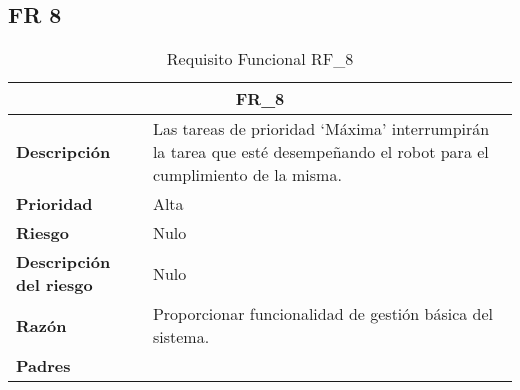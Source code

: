 \documentclass{scrreprt}
\begin{document}
\subsection{FR 8}
\begin{table}[H]
    
    \label{tab:my-table}
    
    \begin{tabular}{|p{5cm}|p{11cm}|}
    \hline
    \multicolumn{2}{|c|}{\textbf{FR_8}} \\
    \hline
    \textbf{Descripción  }                      & Las tareas de prioridad ‘Máxima’ interrumpirán la tarea que esté desempeñando el robot para el cumplimiento de la misma.                                                                          \\ \hline
    \textbf{Prioridad}                          & Alta                                                                                              \\ \hline
    \textbf{Riesgo}                          & Nulo                                                                                                \\ \hline
    \textbf{Descripción del riesgo}                    & Nulo                                                                               \\ \hline
    \textbf{Razón}                   & Proporcionar funcionalidad de gestión básica del sistema.                                                                                               \\ \hline
    \textbf{Padres}                               &  \\  \hline
\end{tabular}%

\caption{Requisito Funcional RF_8}
\end{table}
\end{document}
